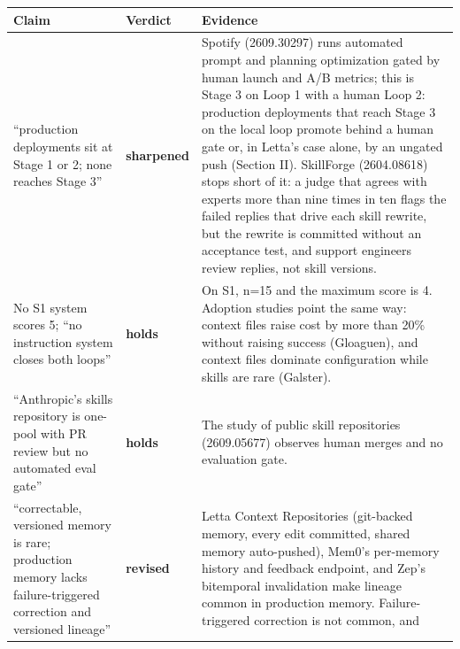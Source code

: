 \documentclass[
]{article}
\newcounter{none} %
\begin{document}
{\def\LTcaptype{none} %
\begin{longtable}[]{@{}
  >{\raggedright\arraybackslash}p{}
  >{\raggedright\arraybackslash}p{}
  >{\raggedright\arraybackslash}p{}@{}}
\toprule\noalign{}
\begin{minipage}[b]{\linewidth}\raggedright
Claim
\end{minipage} & \begin{minipage}[b]{\linewidth}\raggedright
Verdict
\end{minipage} & \begin{minipage}[b]{\linewidth}\raggedright
Evidence
\end{minipage} \\
\midrule\noalign{}
\endhead
\bottomrule\noalign{}
\endlastfoot
``production deployments sit at Stage 1 or 2; none reaches Stage 3'' &
\textbf{sharpened} & Spotify (2609.30297) runs automated prompt and
planning optimization gated by human launch and A/B metrics; this is
Stage 3 on Loop 1 with a human Loop 2: production deployments that reach
Stage 3 on the local loop promote behind a human gate or, in Letta's
case alone, by an ungated push (Section II). SkillForge (2604.08618)
stops short of it: a judge that agrees with experts more than nine times
in ten flags the failed replies that drive each skill rewrite, but the
rewrite is committed without an acceptance test, and support engineers
review replies, not skill versions. \\
No S1 system scores 5; ``no instruction system closes both loops'' &
\textbf{holds} & On S1, n=15 and the maximum score is 4. Adoption
studies point the same way: context files raise cost by more than 20\%
without raising success (Gloaguen), and context files dominate
configuration while skills are rare (Galster). \\
``Anthropic's skills repository is one-pool with PR review but no
automated eval gate'' & \textbf{holds} & The study of public skill
repositories (2609.05677) observes human merges and no evaluation
gate. \\
``correctable, versioned memory is rare; production memory lacks
failure-triggered correction and versioned lineage'' & \textbf{revised}
& Letta Context Repositories (git-backed memory, every edit committed,
shared memory auto-pushed), Mem0's per-memory history and feedback
endpoint, and Zep's bitemporal invalidation make lineage common in
production memory. Failure-triggered correction is not common, and

\end{longtable}}
\end{document}
